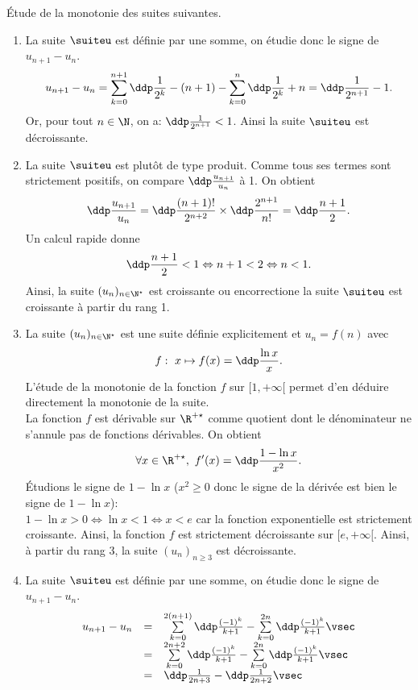 
\begin{correction} \;
\'Etude de la monotonie des suites suivantes.
\begin{enumerate}
 \item La suite $\suiteu$ est d\'efinie par une somme, on \'etudie donc le signe de $u_{n+1}-u_n$.
$$u_{n+1}-u_n=\sum\limits_{k=0}^{n+1}\ddp\frac{1}{2^k}-(n+1)-\sum\limits_{k=0}^{n}\ddp\frac{1}{2^k}+n=\ddp\frac{1}{2^{n+1}}-1.$$
Or, pour tout $n\in\N$, on a: $\ddp\frac{1}{2^{n+1}}<1$. Ainsi la suite $\suiteu$ est d\'ecroissante.
\item La suite $\suiteu$ est plut\^ot de type produit. Comme tous ses termes sont strictement positifs, on compare $\ddp\frac{u_{n+1}}{u_n}$ \`a 1. On obtient
$$\ddp\frac{u_{n+1}}{u_n}=\ddp\frac{(n+1)!}{2^{n+2}} \times \ddp\frac{2^{n+1}}{n!}=\ddp\frac{n+1}{2}.$$
Un calcul rapide donne
$$\ddp\frac{n+1}{2}<1\Leftrightarrow n+1<2\Leftrightarrow n<1.$$
Ainsi, la suite $(u_n)_{n\in\N^{\star}}$ est croissante ou encorrectione la suite $\suiteu$ est croissante \`{a} partir du rang 1.
\item 
La suite $(u_n)_{n\in\N^{\star}}$ est une suite d\'efinie explicitement et $u_n=f(n)$ avec
$$f:\ x\mapsto f(x)=\ddp\frac{\ln{x}}{x}.$$
L'\'etude de la monotonie de la fonction $f$ sur $\lbrack 1,+\infty\lbrack$ permet d'en d\'eduire directement la monotonie de la suite.\\
\noindent La fonction $f$ est d\'erivable sur $\R^{+\star}$ comme quotient dont le d\'enominateur ne s'annule pas de fonctions d\'erivables. On obtient
$$\forall x\in\R^{+\star},\ f^{\prime}(x)=\ddp\frac{1-\ln{x}}{x^2}.$$
\'Etudions le signe de $1-\ln{x}$ ($x^2\geq 0$ donc le signe de la d\'eriv\'ee est bien le signe de $1-\ln{x}$):\\
\noindent $1-\ln{x}>0  \Leftrightarrow  \ln{x}<1
\Leftrightarrow x<e $ car la fonction exponentielle est strictement croissante.
Ainsi, la fonction $f$ est strictement d\'ecroissante sur $\lbrack e,+\infty\lbrack$. Ainsi, \`a partir du rang 3, la suite $(u_n)_{n\geq 3}$ est d\'ecroissante.
\item La suite $\suiteu$ est d\'efinie par une somme, on \'etudie donc le signe de $u_{n+1}-u_n$.
$$\begin{array}{lll}
u_{n+1}-u_n&=&\sum\limits_{k=0}^{2(n+1)}\ddp\frac{(-1)^k}{k+1}-\sum\limits_{k=0}^{2n}\ddp\frac{(-1)^k}{k+1}\vsec\\
&=& \sum\limits_{k=0}^{2n+2}\ddp\frac{(-1)^k}{k+1}-\sum\limits_{k=0}^{2n}\ddp\frac{(-1)^k}{k+1}\vsec\\
&=& \ddp\frac{1}{2n+3}-\ddp\frac{1}{2n+2}\vsec\\

\end{array}$$
\end{enumerate}
\end{correction}
